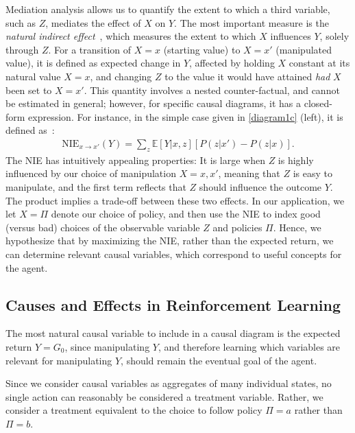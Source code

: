 \documentclass[letterpaper]{article} %
\newcommand{\EE}{\mathbb{E}}
\newcommand{\NIE}{\textrm{NIE}\xspace}
\begin{document}
	
	Mediation analysis allows us to quantify the extent to which a third variable, such as $Z$, mediates the effect of $X$ on $Y$. The most important measure is the \emph{natural indirect effect}~\cite{pearl2012mediation,pearl2001direct}, which measures the extent to which $X$ influences $Y$, solely through $Z$. For a transition of $X=x$ (starting value) to $X=x'$ (manipulated value), it is defined as expected change in $Y$, affected by holding $X$ constant at its natural value $X=x$, and changing $Z$ to the value it would have attained \emph{had} $X$ been set to $X=x'$. This quantity involves a nested counter-factual, and cannot be estimated in general; however, for specific causal diagrams, it has a closed-form expression. For instance, in the simple case given in \cref{diagram1c} (left), it is defined as~\cite{pearl2001direct}:
	\begin{align}
		\NIE_{x \rightarrow x'}(Y) = \sum_z \EE\left[Y | x,z\right][ P(z | x') - P(z | x)].\label{eqNIE}
	\end{align}
	The \NIE has intuitively appealing properties: It is large when $Z$ is highly influenced by our choice of manipulation $X=x, x'$, meaning that $Z$ is easy to manipulate, and the first term reflects that $Z$ should influence the outcome $Y$. The product implies a trade-off between these two effects. In our application, we let $X=\Pi$ denote our choice of policy, and then use the \NIE to index good (versus bad) choices of the observable variable $Z$ and policies $\Pi$. Hence, we hypothesize that by maximizing the \NIE, rather than the expected return, we can determine relevant causal variables, which correspond to useful concepts for the agent.
	
	\subsection{Causes and Effects in Reinforcement Learning}
	The most natural causal variable to include in a causal diagram is the expected return $Y= G_0$, since manipulating $Y$, and therefore learning which variables are relevant for manipulating $Y$, should remain the eventual goal of the agent. 
	
	Since we consider causal variables as aggregates of many individual states, no single action can reasonably be considered a treatment variable. Rather, we consider a treatment equivalent to the choice to follow policy $\Pi = a$ rather than $\Pi = b$. 
	
\end{document}
